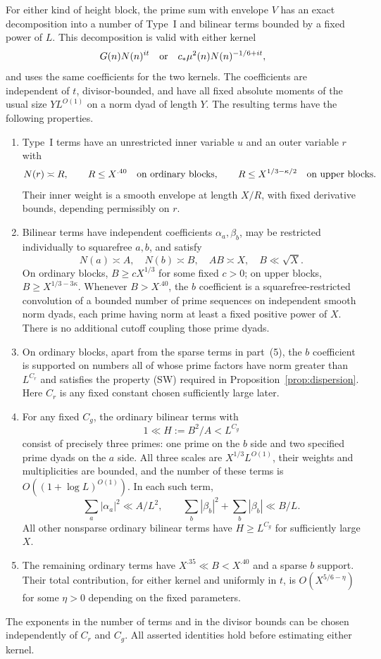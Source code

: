 \begin{proposition}\label{prop:decomposition}
For either kind of height block, the prime sum with envelope $V$ has
an exact decomposition into a number of Type~I and bilinear terms
bounded by a fixed power of $L$.  This decomposition is valid with
either kernel
\[
 G(n)N(n)^{it}
 \quad\hbox{or}\quad
 c_*\mu^2(n)N(n)^{-1/6+it},
\]
and uses the same coefficients for the two kernels.  The coefficients
are independent of $t$, divisor-bounded, and have all fixed absolute
moments of the usual size $Y L^{O(1)}$ on a norm dyad of length $Y$.
The resulting terms have the following properties.
\begin{enumerate}
\item Type~I terms have an unrestricted inner variable $u$ and an outer
variable $r$ with
\[
 N(r)\asymp R,\qquad
 R\le X^{.40}\quad\hbox{on ordinary blocks},\qquad
 R\le X^{1/3-\kappa/2}\quad\hbox{on upper blocks}.
\]
Their inner weight is a smooth envelope at length $X/R$, with fixed
derivative bounds, depending permissibly on $r$.
\item Bilinear terms have independent coefficients $\alpha_a,\beta_b$,
may be restricted individually to squarefree $a,b$, and satisfy
\[
 N(a)\asymp A,\quad N(b)\asymp B,\quad AB\asymp X,\quad B\ll\sqrt X.
\]
On ordinary blocks, $B\ge cX^{1/3}$ for some fixed $c>0$; on upper
blocks, $B\ge X^{1/3-3\kappa}$.  Whenever $B>X^{.40}$, the $b$
coefficient is a squarefree-restricted convolution of a bounded number
of prime sequences on independent smooth norm dyads, each prime
having norm at least a fixed positive power of $X$.  There is no
additional cutoff coupling those prime dyads.
\item On ordinary blocks, apart from the sparse terms in part~(5),
the $b$ coefficient is supported on numbers all of whose prime factors
have norm greater than $L^{C_r}$ and satisfies the property
\textup{(SW)} required in Proposition~\ref{prop:dispersion}.
Here $C_r$ is any fixed constant chosen sufficiently large later.
\item For any fixed $C_g$, the ordinary bilinear terms with
\[
 1\ll H:=B^2/A<L^{C_g}
\]
consist of precisely three primes: one prime on the $b$ side and two
specified prime dyads on the $a$ side.  All three scales are
$X^{1/3}L^{O(1)}$, their weights and multiplicities are bounded, and
the number of these terms is $O((1+\log L)^{O(1)})$.  In each such
term,
\begin{equation}\label{eq:decomposition-triple-moments}
 \sum_a|\alpha_a|^2\ll A/L^2,
 \qquad
 \sum_b|\beta_b|^2+\sum_b|\beta_b|\ll B/L.
\end{equation}
All other nonsparse ordinary bilinear terms have $H\ge L^{C_g}$
for sufficiently large $X$.
\item The remaining ordinary terms have $X^{.35}\ll B<X^{.40}$
and a sparse $b$ support.  Their total contribution, for either kernel
and uniformly in $t$, is $O(X^{5/6-\eta})$ for some $\eta>0$ depending
on the fixed parameters.
\end{enumerate}
The exponents in the number of terms and in the divisor bounds can be
chosen independently of $C_r$ and $C_g$.  All asserted identities
hold before estimating either kernel.
\end{proposition}
